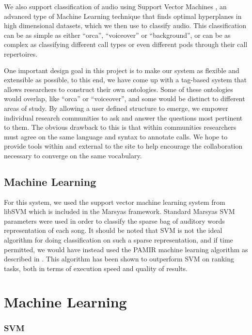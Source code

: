 \documentclass[12pt,oneside]{book}
\begin{document}
We also support classification of audio using Support Vector
Machines \cite{mandel-ismir2005}, an advanced type of Machine Learning
technique that finds optimal hyperplanes in high dimensional datasets,
which we then use to classify audio.  This classification can be as
simple as either ``orca'', ``voiceover'' or ``background'', or can be
as complex as classifying different call types or even different pods
through their call repertoires.  

One important design goal in this project is to make our system as
flexible and extensible as possible, to this end, we have come up with
a tag-based system that allows researchers to construct their own
ontologies.  Some of these ontologies would overlap, like ``orca'' or
``voiceover'', and some would be distinct to different areas of study.
By allowing a user defined structure to emerge, we empower individual
research communities to ask and answer the questions most pertinent to
them.  The obvious drawback to this is that within communities
researchers must agree on the same language and syntax to annotate
calls.  We hope to provide tools within and external to the site to
help encourage the collaboration necessary to converge on the same
vocabulary.

\subsection{Machine Learning}
\label{section:softwareAndSystems:machineLearning}

For this system, we used the support vector machine learning system
from libSVM which is included in the Marsyas\cite{marsyas} framework.
Standard Marsyas SVM parameters were used in order to classify the
sparse bag of auditory words representation of each song.  It should
be noted that SVM is not the ideal algorithm for doing classification
on such a sparse representation, and if time permitted, we would have
instead used the PAMIR machine learning algorithm as described in
\cite{lyon10}.  This algorithm has been shown to outperform SVM on
ranking tasks, both in terms of execution speed and quality of
results.

\section{Machine Learning}

\subsubsection{SVM}
\end{document}
